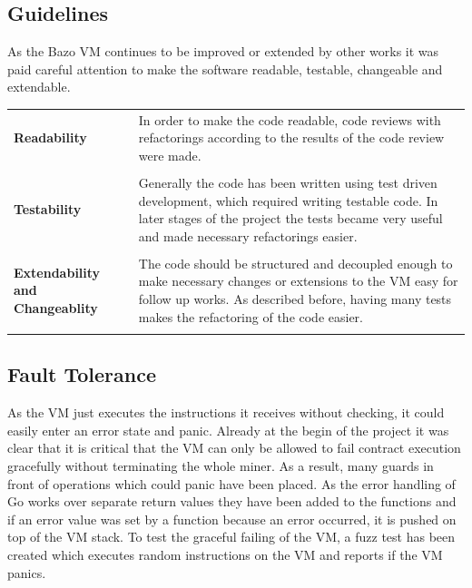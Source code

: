 \subsection{Guidelines}
As the Bazo VM continues to be improved or extended by other works it was paid careful attention to make the software readable, testable, changeable and extendable. 

\begin{tabular}[t]{ p{3cm} p{12.5cm}}
\raggedright
\textbf{Readability} &
In order to make the code readable, code reviews with refactorings according to the results of the code review were made. \\ \\

\raggedright
\textbf{Testability} &
Generally the code has been written using test driven development, which required writing testable code. In later stages of the project the tests became very useful and made necessary refactorings easier. \\ \\
 
\raggedright
\textbf{Extendability and Changeablity} &
The code should be structured and decoupled enough to make necessary changes or extensions to the VM easy for follow up works. As described before, having many tests makes the refactoring of the code easier. \\ \\ 
\end{tabular}

\subsection{Fault Tolerance}
As the VM just executes the instructions it receives without checking, it could easily enter an error state and panic. Already at the begin of the project it was clear that it is critical that the VM can only be allowed to fail contract execution gracefully without terminating the whole miner. As a result, many guards in front of operations which could panic have been placed. As the error handling of Go works over separate return values they have been added to the functions and if an error value was set by a function because an error occurred, it is pushed on top of the VM stack. To test the graceful failing of the VM, a fuzz test has been created which executes random instructions on the VM and reports if the VM panics. 

